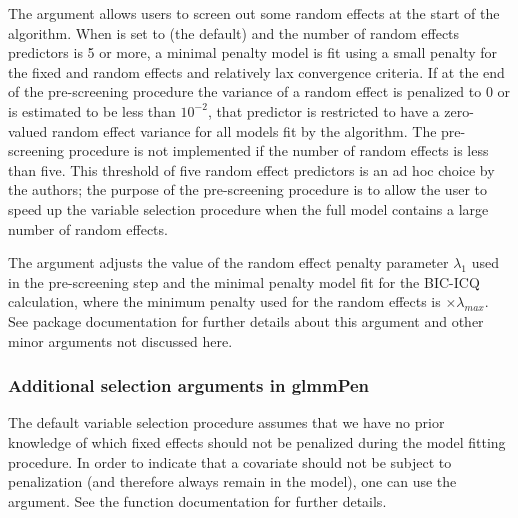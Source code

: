 The argument  allows users to screen out some random
effects at the start of the algorithm. When  is set
to  (the default) and the number of random effects predictors is 5 or more, a minimal penalty model is fit using a small penalty
for the fixed and random effects and relatively lax convergence
criteria. If at the end of the pre-screening procedure the variance of a
random effect is penalized to 0 or is estimated to be less than
\(10^{-2}\), that predictor is restricted to have a zero-valued random
effect variance for all models fit by the algorithm. The pre-screening
procedure is not implemented if the number of random effects is less
than five. This threshold of five random effect predictors is an ad hoc choice by the authors; the purpose of the pre-screening procedure is to allow the user to speed up the variable selection procedure when the full model contains a large number of random effects.

The argument  adjusts the value of the random effect penalty parameter $\lambda_1$ used in the pre-screening step and the minimal penalty model fit for the BIC-ICQ calculation, where the minimum penalty used for the random effects is  \(\times \lambda_{max}\). See package documentation for further details about this argument and other minor arguments not discussed here.

\subsubsection{Additional selection arguments in
glmmPen}
\label{sec:additional}

The default variable selection procedure assumes that we have no prior
knowledge of which fixed effects should not be penalized during the model fitting procedure. In order to indicate that a covariate should not be subject to penalization (and therefore always remain in the model), one can use the  argument. See the  function documentation for further details. 

